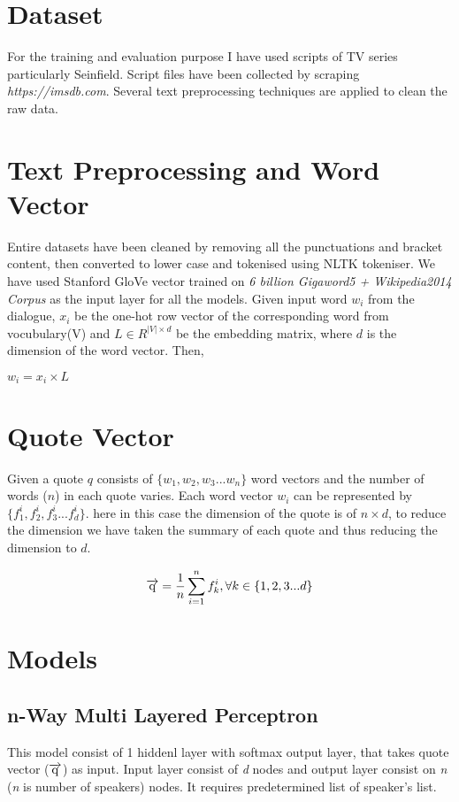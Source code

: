 \documentclass[conference]{IEEEtran}
\begin{document}
\section{Dataset}
For the training and evaluation purpose I have used scripts of TV series particularly Seinfield. Script files have been collected by scraping \emph{https://imsdb.com}. Several text preprocessing techniques are applied to clean the raw data.

\section{Text Preprocessing and Word Vector} 
Entire datasets have been cleaned by removing all the punctuations and bracket content, then converted to lower case and tokenised using NLTK tokeniser. We have used Stanford GloVe vector trained on \emph{6 billion Gigaword5 + Wikipedia2014 Corpus} as the input layer for all the models. Given input word $w_i$ from the dialogue, $x_i$ be the one-hot row vector of the corresponding word from vocubulary(V) and $L \in  R^{|V| \times d}$  be the embedding matrix, where $d$ is the dimension of the word vector. Then,

\begin{center}
	$w_i = x_i \times L$
\end{center}

\section{Quote Vector}
Given a quote $q$ consists of $\{w_1, w_2, w_3 ... w_n\}$ word vectors and the number of words ($n$) in each quote varies. Each word vector $w_i$ can be represented by $\{f_1^i, f_2^i, f_3^i ... f_d^i\}$. here in this case the dimension of the quote is of $n \times d$, to reduce the dimension we have taken the summary of each quote and thus reducing the dimension to $d$.

\begin{center}
	$$\overrightarrow{\rm q} = \frac{1}{n} \sum_{i=1}^{n} f_k^i , \forall k \in \{1,2,3 ... d\} $$
\end{center}

\section{Models}
\subsection{n-Way Multi Layered Perceptron}
This model consist of 1 hiddenl layer with softmax output layer, that takes quote vector ($\overrightarrow{\rm q}$) as input. Input layer consist of \emph{d} nodes and output layer consist on \emph{n} (\emph{n} is number of speakers) nodes. It requires predetermined list of speaker's list.
\end{document}
